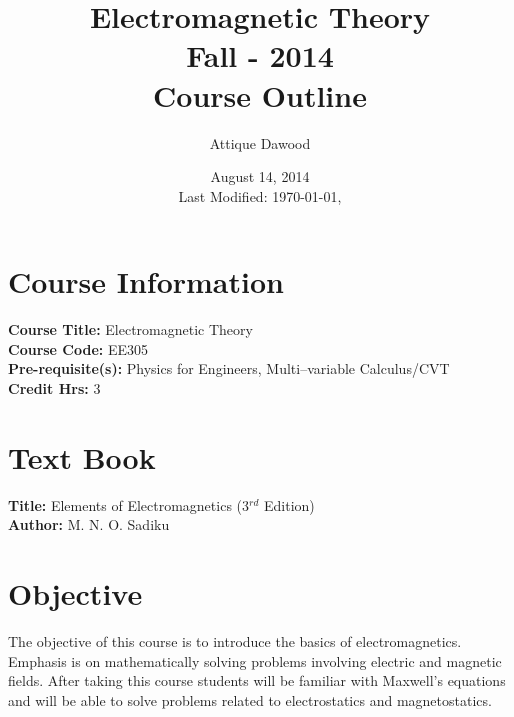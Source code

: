 \documentclass[12pt,a4paper]{article}
\title{\vspace{-1.5cm}Electromagnetic Theory\\Fall - 2014\\Course Outline}
\author{Attique Dawood}
\date{August 14, 2014\\[0.2cm] Last Modified: \today, \currenttime}
\begin{document}
\maketitle
\section{Course Information}
\noindent\textbf{Course Title:} Electromagnetic Theory\\
\textbf{Course Code:} EE305\\
\textbf{Pre-requisite(s):} Physics for Engineers, Multi--variable Calculus/CVT\\
\textbf{Credit Hrs:} 3\\
\section{Text Book}
\textbf{Title:} Elements of Electromagnetics (3$^{rd}$ Edition)\\
\textbf{Author:} M. N. O. Sadiku\\[0.5cm]
\section{Objective}
The objective of this course is to introduce the basics of electromagnetics. Emphasis is on mathematically solving problems involving electric and magnetic fields. After taking this course students will be familiar with Maxwell's equations and will be able to solve problems related to electrostatics and magnetostatics.
\end{document}
